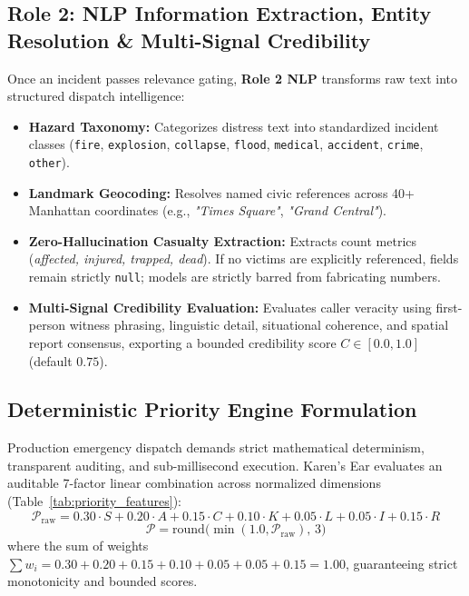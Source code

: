 \documentclass[10pt,a4paper]{article}
\begin{document}
\subsection{Role 2: NLP Information Extraction, Entity Resolution \& Multi-Signal Credibility}
Once an incident passes relevance gating, \textbf{Role 2 NLP} transforms raw text into structured dispatch intelligence:
\begin{itemize}
  \item \textbf{Hazard Taxonomy:} Categorizes distress text into standardized incident classes (\texttt{fire}, \texttt{explosion}, \texttt{collapse}, \texttt{flood}, \texttt{medical}, \texttt{accident}, \texttt{crime}, \texttt{other}).
  \item \textbf{Landmark Geocoding:} Resolves named civic references across 40+ Manhattan coordinates (e.g., \emph{"Times Square"}, \emph{"Grand Central"}).
  \item \textbf{Zero-Hallucination Casualty Extraction:} Extracts count metrics (\emph{affected, injured, trapped, dead}). If no victims are explicitly referenced, fields remain strictly \texttt{null}; models are strictly barred from fabricating numbers.
  \item \textbf{Multi-Signal Credibility Evaluation:} Evaluates caller veracity using first-person witness phrasing, linguistic detail, situational coherence, and spatial report consensus, exporting a bounded credibility score $C \in [0.0, 1.0]$ (default $0.75$).
\end{itemize}

\subsection{Deterministic Priority Engine Formulation}
Production emergency dispatch demands strict mathematical determinism, transparent auditing, and sub-millisecond execution. Karen's Ear evaluates an auditable 7-factor linear combination across normalized dimensions (Table~\ref{tab:priority_features}):
\begin{equation}
  \mathcal{P}_{\text{raw}} = 0.30 \cdot S + 0.20 \cdot A + 0.15 \cdot C + 0.10 \cdot K + 0.05 \cdot L + 0.05 \cdot I + 0.15 \cdot R
\end{equation}
\begin{equation}
  \mathcal{P} = \mathrm{round}\Big(\min\left(1.0, \mathcal{P}_{\text{raw}}\right),\, 3\Big)
\end{equation}
where the sum of weights $\sum w_i = 0.30 + 0.20 + 0.15 + 0.10 + 0.05 + 0.05 + 0.15 = 1.00$, guaranteeing strict monotonicity and bounded scores.
\end{document}
